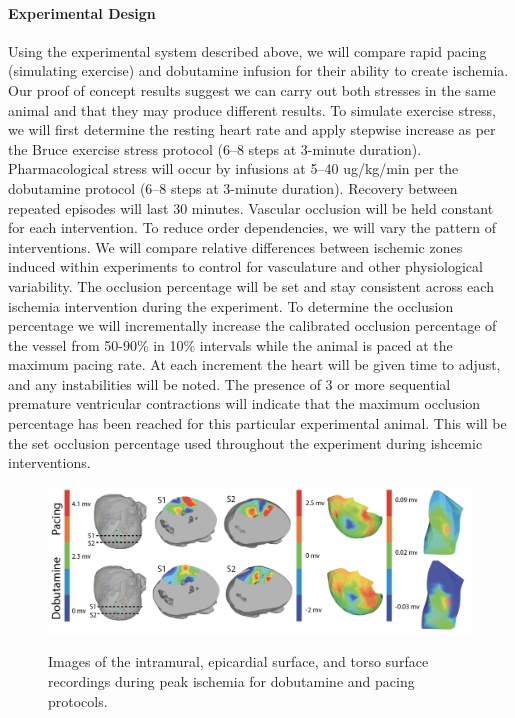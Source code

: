 \paragraph{Experimental Design} Using the experimental system described above, we will compare rapid pacing (simulating exercise) and dobutamine infusion for their ability to create ischemia. Our proof of concept results suggest we can carry out both stresses in the same animal and that they may produce different results.  To simulate exercise stress, we will first determine the resting heart rate and apply stepwise increase as per the Bruce exercise stress protocol (6--8 steps at 3-minute duration).\cite{BLZ:Oki1986} Pharmacological stress will occur by infusions at 5--40 ug/kg/min per the dobutamine protocol (6--8 steps at 3-minute duration).\cite{BLZ:SAL1992} Recovery between repeated episodes will last 30 minutes. Vascular occlusion will be held constant for each intervention. To reduce order dependencies, we will vary the pattern of interventions. We will compare relative differences between ischemic zones induced within experiments to control for vasculature and other physiological variability. The occlusion percentage will be set and stay consistent across each ischemia intervention during the experiment. To determine the occlusion percentage we will incrementally increase the calibrated occlusion percentage of the vessel from 50-90\% in 10\% intervals while the animal is paced at the maximum pacing rate. At each increment the heart will be given time to adjust, and any instabilities will be noted. The presence of 3 or more sequential premature ventricular contractions will indicate that the maximum occlusion percentage has been reached for this particular experimental animal. This will be the set occlusion percentage used throughout the experiment during ishcemic interventions. 


\begin{figure}[htb]%
    \begin{center}
        {\includegraphics[width=\textwidth]
          {../Figures/fig2.png}}
        \captionsetup{width = \textwidth}
        \caption{\small \label{fig:dobutvspacing} Images of the
          intramural, epicardial surface, and torso surface recordings
          during peak ischemia for dobutamine and pacing protocols.}
    \end{center}
\end{figure}


